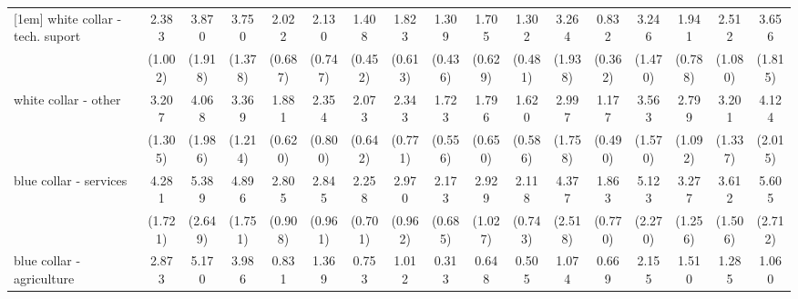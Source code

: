 {\begin{tabular}{l*{16}{c}}
[1em]
white collar - tech. suport&       2.383\sym{*}  &       3.870\sym{**} &       3.750\sym{***}&       2.022\sym{*}  &       2.130\sym{*}  &       1.408         &       1.823         &       1.309         &       1.705         &       1.302         &       3.264\sym{*}  &       0.832         &       3.246\sym{**} &       1.941         &       2.512\sym{*}  &       3.656\sym{**} \\
                    &     (1.002)         &     (1.918)         &     (1.378)         &     (0.687)         &     (0.747)         &     (0.452)         &     (0.613)         &     (0.436)         &     (0.629)         &     (0.481)         &     (1.938)         &     (0.362)         &     (1.470)         &     (0.788)         &     (1.080)         &     (1.815)         \\
[1em]
white collar - other&       3.207\sym{**} &       4.068\sym{**} &       3.369\sym{***}&       1.881         &       2.354\sym{*}  &       2.073\sym{*}  &       2.343\sym{**} &       1.723         &       1.796         &       1.620         &       2.997         &       1.177         &       3.563\sym{**} &       2.799\sym{**} &       3.201\sym{**} &       4.124\sym{**} \\
                    &     (1.305)         &     (1.986)         &     (1.214)         &     (0.620)         &     (0.800)         &     (0.642)         &     (0.771)         &     (0.556)         &     (0.650)         &     (0.586)         &     (1.758)         &     (0.490)         &     (1.570)         &     (1.092)         &     (1.337)         &     (2.015)         \\
[1em]
blue collar - services&       4.281\sym{***}&       5.389\sym{***}&       4.896\sym{***}&       2.805\sym{**} &       2.845\sym{**} &       2.258\sym{**} &       2.970\sym{***}&       2.173\sym{*}  &       2.929\sym{**} &       2.118\sym{*}  &       4.377\sym{*}  &       1.863         &       5.123\sym{***}&       3.277\sym{**} &       3.612\sym{**} &       5.605\sym{***}\\
                    &     (1.721)         &     (2.649)         &     (1.751)         &     (0.908)         &     (0.961)         &     (0.701)         &     (0.962)         &     (0.685)         &     (1.027)         &     (0.743)         &     (2.518)         &     (0.770)         &     (2.270)         &     (1.256)         &     (1.506)         &     (2.712)         \\
[1em]
blue collar - agriculture&       2.873\sym{*}  &       5.170\sym{**} &       3.986\sym{**} &       0.831         &       1.369         &       0.753         &       1.012         &       0.313         &       0.648         &       0.505         &       1.074         &       0.669         &       2.155         &       1.510         &       1.285         &       1.060         \\

\end{tabular}}
